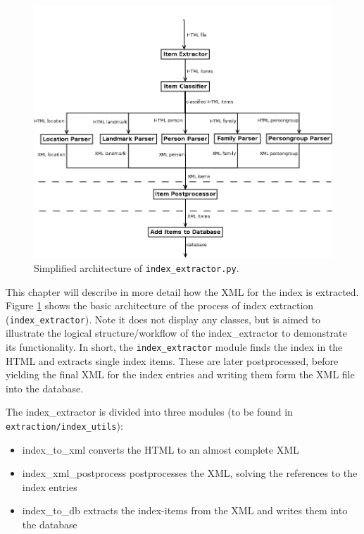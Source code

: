 \begin{figure}[h]
  \centering
  \includegraphics[scale=0.4]{img/index-extractor}
  \caption{Simplified architecture of \texttt{index\_extractor.py}.}
  \label{fig:index-extractor}
\end{figure}

This chapter will describe in more detail how the XML for the index is extracted. 
Figure \ref{fig:index-extractor} shows the basic architecture of the process of index extraction (\texttt{index\_extractor}). Note it does not display any classes, but is aimed to illustrate the logical structure/workflow of the index\_extractor to demonstrate its functionality. In short, the \texttt{index\_extractor} module finds the index in the HTML and extracts single index items. These are later postprocessed, before yielding the final XML for the index entries and writing them form the XML file into the database.

The index\_extractor is divided into three modules (to be found in \texttt{extraction/index\_utils}):

\begin{itemize}
\item index\_to\_xml converts the HTML to an almost complete XML
\item index\_xml\_postprocess postprocesses the XML, solving the references to the index entries
\item index\_to\_db extracts the index-items from the XML and writes them into the database
\end{itemize}

